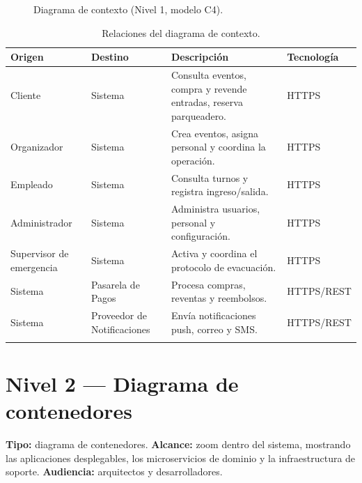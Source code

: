 \documentclass[12pt,a4paper]{article}
\begin{document}
\begin{figure}[H]
{
}
\caption{Diagrama de contexto (Nivel 1, modelo C4).}
\end{figure}

\begin{longtable}{p{3cm}p{3cm}p{6.5cm}p{2.3cm}}
\toprule
\textbf{Origen} & \textbf{Destino} & \textbf{Descripción} & \textbf{Tecnología}\\
\midrule
Cliente & Sistema & Consulta eventos, compra y revende entradas, reserva parqueadero. & HTTPS\\
Organizador & Sistema & Crea eventos, asigna personal y coordina la operación. & HTTPS\\
Empleado & Sistema & Consulta turnos y registra ingreso/salida. & HTTPS\\
Administrador & Sistema & Administra usuarios, personal y configuración. & HTTPS\\
Supervisor de emergencia & Sistema & Activa y coordina el protocolo de evacuación. & HTTPS\\
Sistema & Pasarela de Pagos & Procesa compras, reventas y reembolsos. & HTTPS/REST\\
Sistema & Proveedor de Notificaciones & Envía notificaciones push, correo y SMS. & HTTPS/REST\\
\bottomrule
\caption{Relaciones del diagrama de contexto.}
\end{longtable}

\section{Nivel 2 — Diagrama de contenedores}

\textbf{Tipo:} diagrama de contenedores. \textbf{Alcance:} zoom dentro del sistema, mostrando las
aplicaciones desplegables, los microservicios de dominio y la infraestructura de soporte.
\textbf{Audiencia:} arquitectos y desarrolladores.
\end{document}
